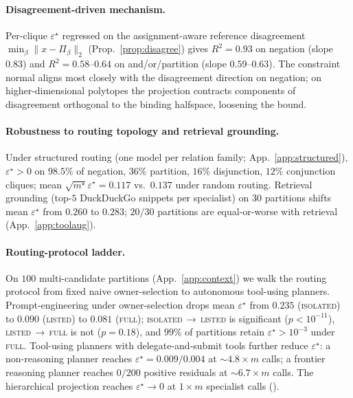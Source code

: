 \documentclass{article}
\theoremstyle{plain}
\theoremstyle{definition}
\theoremstyle{remark}
\newcommand{\eps}{\varepsilon}
\begin{document}
\paragraph{Disagreement-driven mechanism.}
Per-clique $\eps^\star$ regressed on the assignment-aware reference
disagreement $\min_\beta\|x{-}\Pi_\beta\|_2$
(Prop.~\ref{prop:disagree}) gives $R^2{=}0.93$ on negation (slope
$0.83$) and $R^2{=}0.58$--$0.64$ on and/or/partition (slope
$0.59$--$0.63$). The constraint normal aligns most closely with
the disagreement direction on negation; on higher-dimensional
polytopes the projection contracts components of disagreement
orthogonal to the binding halfspace, loosening the bound.

\paragraph{Robustness to routing topology and retrieval grounding.}
Under structured routing (one model per relation family;
App.~\ref{app:structured}), $\eps^\star\!>\!0$ on $98.5\%$ of
negation, $36\%$ partition, $16\%$ disjunction, $12\%$ conjunction
cliques; mean $\sqrt{m^\star}\eps^\star\!=\!0.117$ vs.\ $0.137$
under random routing. Retrieval grounding (top-$5$ DuckDuckGo
snippets per specialist) on $30$ partitions shifts mean $\eps^\star$
from $0.260$ to $0.283$; $20/30$ partitions are equal-or-worse with
retrieval (App.~\ref{app:toolaug}).

\paragraph{Routing-protocol ladder.}
On $100$ multi-candidate partitions (App.~\ref{app:context}) we
walk the routing protocol from fixed naive owner-selection to
autonomous tool-using planners. Prompt-engineering under
owner-selection drops mean $\eps^\star$ from $0.235$
(\textsc{isolated}) to $0.090$ (\textsc{listed}) to $0.081$
(\textsc{full}); \textsc{isolated}\,$\to$\,\textsc{listed} is
significant ($p\!<\!10^{-11}$), \textsc{listed}\,$\to$\,\textsc{full}
is not ($p\!=\!0.18$), and $99\%$ of partitions retain
$\eps^\star\!>\!10^{-3}$ under \textsc{full}. Tool-using planners
with delegate-and-submit tools further reduce $\eps^\star$: a
non-reasoning planner reaches $\eps^\star\!=\!0.009/0.004$ at
$\sim\!4.8\!\times m$ calls; a frontier reasoning planner reaches
$0/200$ positive residuals at $\sim\!6.7\!\times m$ calls. The
hierarchical projection reaches $\eps^\star\!\to\!0$ at
$1\!\times m$ specialist calls ().
\end{document}
